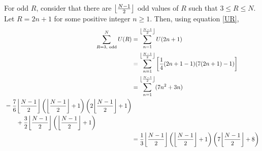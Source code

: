 \documentclass[12pt]{article}
\DeclarePairedDelimiter\floor{\lfloor}{\rfloor}
\begin{document}
For odd $R$, consider that there are $\floor*{\frac{N-1}{2}}$ odd values of $R$ such that $3 \le R \le N$. Let $R = 2n + 1$ for some positive integer $n \ge 1$. Then, using equation \ref{UR},
\begin{align}
  \sum_{R=3,\text{ odd}}^N U(R) &= \sum_{n=1}^{\floor*{\frac{N-1}{2}}} U(2n + 1) \nonumber \\
  &= \sum_{n=1}^{\floor*{\frac{N-1}{2}}} \left[ \frac{1}{4}(2n + 1 - 1)(7(2n + 1) - 1) \right] \nonumber \\
  &= \sum_{n=1}^{\floor*{\frac{N-1}{2}}} (7n^2 + 3n) \nonumber \\
  \begin{split}
    &= \frac{7}{6} \floor*{\frac{N-1}{2}} \left( \floor*{\frac{N-1}{2}} + 1 \right) \left( 2\floor*{\frac{N-1}{2}} + 1 \right) \\
    &\qquad + \frac{3}{2} \floor*{\frac{N-1}{2}} \left( \floor*{\frac{N-1}{2}} + 1 \right)
  \end{split} \nonumber \\
  &= \frac{1}{3} \floor*{\frac{N-1}{2}} \left( \floor*{\frac{N-1}{2}} + 1 \right) \left( 7\floor*{\frac{N-1}{2}} + 8 \right) \label{TnoddR}
\end{align}
\end{document}

